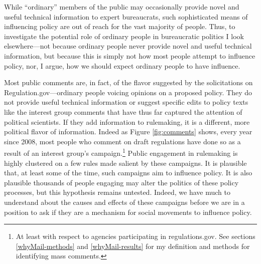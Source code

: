 %  

While ``ordinary'' members of the public may occasionally provide novel and useful technical information to expert bureaucrats, such sophisticated means of influencing policy are out of reach for the vast majority of people. Thus, to investigate the potential role of ordinary people in bureaucratic politics I look elsewhere---not because ordinary people never provide novel and useful technical information, but because this is simply not how most people attempt to influence policy, nor, I argue, how we should expect ordinary people to have influence.

Most public comments are, in fact, of the flavor suggested by the solicitations on Regulation.gov---ordinary people voicing opinions on a proposed policy. They do not provide useful technical information or suggest specific edits to policy texts like the interest group comments that have thus far captured the attention of political scientists. If they add information to rulemaking, it is a different, more political flavor of information.  Indeed as Figure \ref{fig:comments} shows, every year since 2008, most people who comment on draft regulations have done so as a result of an interest group's campaign.\footnote{At least with respect to agencies participating in regulations.gov. See sections \ref{whyMail-methods} and \ref{whyMail-results} for my definition and methods for identifying mass comments.} 
Public engagement in rulemaking is highly clustered on a few rules made salient by these campaigns. It is plausible that, at least some of the time, such campaigns aim to influence policy. It is also plausible thousands of people engaging may alter the politics of these policy processes, but this hypothesis remains untested. Indeed, we have much to understand about the causes and effects of these campaigns before we are in a position to ask if they are a mechanism for social movements to influence policy.

